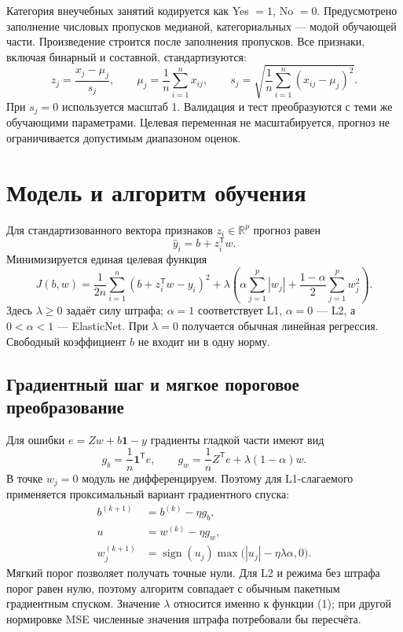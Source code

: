 Категория внеучебных занятий кодируется как Yes $=1$, No $=0$. Предусмотрено заполнение числовых пропусков медианой, категориальных --- модой обучающей части. Произведение строится после заполнения пропусков. Все признаки, включая бинарный и составной, стандартизуются:
\[
z_j=\frac{x_j-\mu_j}{s_j},\qquad
\mu_j=\frac{1}{n}\sum_{i=1}^{n}x_{ij},\qquad
s_j=\sqrt{\frac{1}{n}\sum_{i=1}^{n}(x_{ij}-\mu_j)^2}.
\]
При $s_j=0$ используется масштаб 1. Валидация и тест преобразуются с теми же обучающими параметрами. Целевая переменная не масштабируется, прогноз не ограничивается допустимым диапазоном оценок.

\clearpage
\section{Модель и алгоритм обучения}
Для стандартизованного вектора признаков $z_i\in\mathbb{R}^{p}$ прогноз равен
\[
\hat y_i=b+z_i^\mathsf{T}w.
\]
Минимизируется единая целевая функция
\begin{equation}
J(b,w)=\frac{1}{2n}\sum_{i=1}^{n}(b+z_i^\mathsf{T}w-y_i)^2
+\lambda\left(\alpha\sum_{j=1}^{p}|w_j|
+\frac{1-\alpha}{2}\sum_{j=1}^{p}w_j^2\right).
\end{equation}
Здесь $\lambda\geq0$ задаёт силу штрафа; $\alpha=1$ соответствует L1, $\alpha=0$ --- L2, а $0<\alpha<1$ --- ElasticNet. При $\lambda=0$ получается обычная линейная регрессия. Свободный коэффициент $b$ не входит ни в одну норму.

\subsection{Градиентный шаг и мягкое пороговое преобразование}
Для ошибки $e=Zw+b\mathbf{1}-y$ градиенты гладкой части имеют вид
\[
g_b=\frac{1}{n}\mathbf{1}^{\mathsf T}e,\qquad
g_w=\frac{1}{n}Z^{\mathsf T}e+\lambda(1-\alpha)w.
\]
В точке $w_j=0$ модуль не дифференцируем. Поэтому для L1-слагаемого применяется проксимальный вариант градиентного спуска:
\begin{align}
b^{(k+1)}&=b^{(k)}-\eta g_b,\\
u&=w^{(k)}-\eta g_w,\\
w_j^{(k+1)}&=\operatorname{sign}(u_j)
\max\bigl(|u_j|-\eta\lambda\alpha,0\bigr).
\end{align}
Мягкий порог позволяет получать точные нули. Для L2 и режима без штрафа порог равен нулю, поэтому алгоритм совпадает с обычным пакетным градиентным спуском. Значение $\lambda$ относится именно к функции (1); при другой нормировке MSE численные значения штрафа потребовали бы пересчёта.


